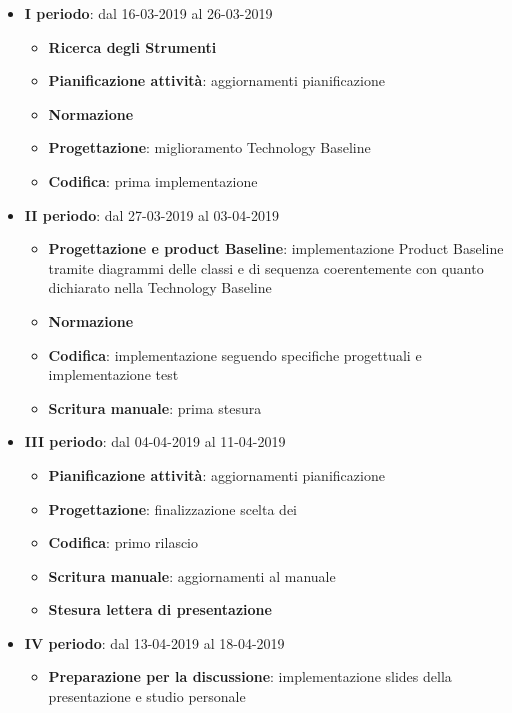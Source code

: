 		\begin{itemize}
			\item \textbf{I periodo}: dal 16-03-2019 al 26-03-2019
			\begin{itemize}
    	        \item \textbf{Ricerca degli Strumenti}
    	        \item \textbf{Pianificazione attività}: aggiornamenti pianificazione
    	        \item \textbf{Normazione}
    	        \item \textbf{Progettazione}: miglioramento Technology Baseline
    	        \item \textbf{Codifica}: prima implementazione
        	\end{itemize}
			\item \textbf{II periodo}: dal 27-03-2019 al 03-04-2019
			\begin{itemize}
				\item \textbf{Progettazione e product Baseline}: implementazione Product Baseline tramite diagrammi delle classi e di sequenza
				coerentemente con quanto dichiarato nella Technology Baseline
    	        \item \textbf{Normazione}
    	        \item \textbf{Codifica}: implementazione seguendo specifiche progettuali e implementazione test
    	        \item \textbf{Scritura manuale}: prima stesura
        	\end{itemize}
        	\item \textbf{III periodo}: dal 04-04-2019 al 11-04-2019
			\begin{itemize}
				\item \textbf{Pianificazione attività}: aggiornamenti pianificazione
    	        \item \textbf{Progettazione}: finalizzazione scelta dei 
    	        \item \textbf{Codifica}: primo rilascio
    	        \item \textbf{Scritura manuale}: aggiornamenti al manuale
    	        \item \textbf{Stesura lettera di presentazione}
        	\end{itemize}
        	\item \textbf{IV periodo}: dal 13-04-2019 al 18-04-2019
			\begin{itemize}
				\item \textbf{Preparazione per la discussione}: implementazione slides della presentazione e studio personale
        	\end{itemize}

\end{itemize}
